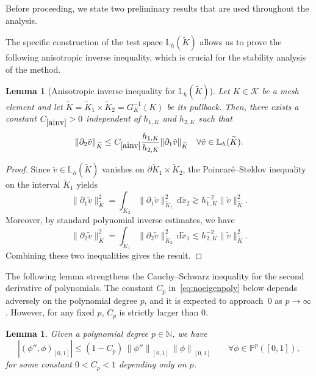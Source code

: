 \documentclass[a4paper,twoside,10pt]{article}
\newtheorem{lemma}[theorem]{Lemma}
\newcommand{\const}[1]{C_{\eqref{#1}}}
\newcommand*{\norm}[1]{\left\|#1\right\|}
\newcommand{\IL}{\mathbb{L}}
\newcommand{\IP}{\mathbb{P}}
\newcommand{\calK}{\mathcal{K}}
\numberwithin{equation}{section}
\newcommand{\Kt}{\widetilde{K}}
\newcommand{\hKot}{h_{1,K}}
\newcommand{\hKtt}{h_{2,K}}
\begin{document}
	Before proceeding, we state two preliminary results that are used 
	throughout the analysis.

	The specific construction of the test space $\IL_h(\Kt)$ allows us to prove the following anisotropic inverse inequality, which is crucial for the stability analysis of the method.
	\begin{lemma}[Anisotropic inverse inequality for $\IL_h(\Kt)$]\label{lem:anisotropic-inverse}
	Let $K\in\calK$ be a mesh element and let $\Kt = \Kt_1 \times \Kt_2=G_K^{-1}(K)$ be its pullback. 
	Then, there exists a constant $\const{ainv}>0$ independent of $\hKot$ and $\hKtt$ such that 
	\begin{equation}\label{ainv}
	    \|\partial_2 \tilde v\|_{\Kt} \leq \const{ainv} \frac{\hKot}{\hKtt} \|\partial_1 \tilde v\|_{\Kt} \quad \forall \tilde v \in \IL_h(\Kt).
	\end{equation}
	\end{lemma}
	\begin{proof}
	Since $\tilde v\in \mathbb L_h(\Kt)$ vanishes
	on $\partial\Kt_1\times \Kt_2$,
	the Poincaré--Steklov inequality on the interval
	$\Kt_1$ yields
	\begin{equation}\label{eq:SteklovPoincare}
	\|\partial_1 \tilde v\|_{\Kt}^2 = \int_{\Kt_2} \|\partial_1 \tilde v\|_{\Kt_1}^2 \,\mathrm{d}\tilde x_2
	\gtrsim \hKot^{-2} \|\tilde v\|_{\Kt}^2.
	\end{equation}
	Moreover, by standard polynomial inverse estimates, we have
	\begin{equation*}
	\|\partial_2 \tilde v\|_{\Kt}^2 
	= \int_{\Kt_1} \|\partial_2 \tilde v\|_{\Kt_2}^2 \,\mathrm{d}\tilde x_1
	\lesssim \hKtt^{-2} \|\tilde v\|_{\Kt}^2.
	\end{equation*}
	Combining these two inequalities gives the result.
	\end{proof}
	The following 
    lemma strengthens the Cauchy--Schwarz inequality for the second derivative of polynomials.
	The constant $C_p$ in~\eqref{eq:noeigenpoly} below depends adversely on the polynomial degree $p$, and it is expected to approach~$0$ as $p\to\infty$.
	However, for any fixed $p$,
    $C_p$ is strictly larger than $0$.
	\begin{lemma}\label{lem:noeigenpoly}
	Given a polynomial degree $p\in\mathbb{N}$, 
    we have 
	\begin{equation}\label{eq:noeigenpoly}
		|(\phi'', \phi)_{[0,1]} | \leq (1-C_p)\,\norm{\phi''}_{[0,1]} \,\norm{\phi}_{[0,1]} \qquad \forall \phi \in \IP^p([0, 1]), 
		\end{equation}
		for some constant $0<C_p<1$ depending only on $p$. 
		\end{lemma}
\end{document}
